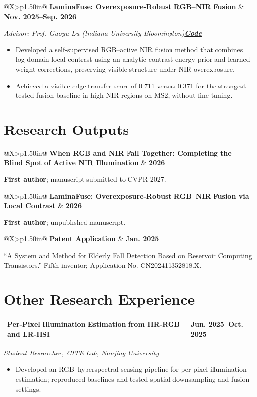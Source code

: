 \documentclass[11pt,letterpaper]{article}
\makeatletter
\newlength{\entryspacing}
\newcommand{\projectlink}[2]{\href{#1}{\textcolor{accent}{\textbf{#2}}}}
\newcommand{\projectlinks}[1]{\enspace\textup{\textbar\enspace #1}}
\newcommand{\datefont}[1]{{\fontsize{9.6}{13.5}\selectfont\bfseries\leavevmode\color{dateblue}#1}}
\newcommand{\entryheader}[2]{%
  \noindent\begin{tabularx}{\linewidth}{@{}X>{\raggedleft\arraybackslash}p{1.50in}@{}}
    {\fontsize{11}{14}\selectfont\bfseries #1} & \datefont{#2}
  \end{tabularx}\par
}
\newcommand{\researchentry}[3]{%
  \Needspace{5\baselineskip}%
  \entryheader{#1}{#2}%
  \vspace{2pt}%
  {\fontsize{10}{13}\selectfont\itshape #3\par}%
}
\newcommand{\compactentry}[3]{%
  \Needspace{4\baselineskip}%
  \entryheader{#1}{#2}%
  \vspace{2pt}%
  {\fontsize{11}{14.3}\selectfont #3\par}%
}
\newcommand{\tightbullets}{%
  \begin{itemize}[leftmargin=1.15em,labelsep=0.40em,itemsep=2pt,topsep=3pt,parsep=0pt,partopsep=0pt]
}
\newcommand{\tightbulletsend}{\end{itemize}}
\newcommand{\entrygap}{\par\vspace{\entryspacing}}
\makeatother
\begin{document}
\entrygap

\researchentry
  {LaminaFuse: Overexposure-Robust RGB--NIR Fusion}
  {Nov. 2025--Sep. 2026}
  {Advisor: Prof. Guoyu Lu (Indiana University Bloomington)\projectlinks{\projectlink{https://github.com/Darhan7/LaminaFuse}{Code}}}
\tightbullets
  \item Developed a self-supervised RGB--active NIR fusion method that combines log-domain local contrast using an analytic contrast-energy prior and learned weight corrections, preserving visible structure under NIR overexposure.
  \item Achieved a visible-edge transfer score of 0.711 versus 0.371 for the strongest tested fusion baseline in high-NIR regions on MS2, without fine-tuning.
\tightbulletsend



\section{Research Outputs}

\compactentry
  {When RGB and NIR Fail Together: Completing the Blind Spot of Active NIR Illumination}
  {2026}
  {\textbf{First author}; manuscript submitted to CVPR 2027.}

\entrygap

\compactentry
  {LaminaFuse: Overexposure-Robust RGB--NIR Fusion via Local Contrast}
  {2026}
  {\textbf{First author}; unpublished manuscript.}

\entrygap

\compactentry
  {Patent Application}
  {Jan. 2025}
  {``A System and Method for Elderly Fall Detection Based on Reservoir Computing Transistors.'' Fifth inventor; Application No. CN202411352818.X.}


\newpage
\section{Other Research Experience}

\researchentry
  {Per-Pixel Illumination Estimation from HR-RGB and LR-HSI}
  {Jun. 2025--Oct. 2025}
  {Student Researcher, CITE Lab, Nanjing University}
\tightbullets
  \item Developed an RGB--hyperspectral sensing pipeline for per-pixel illumination estimation; reproduced baselines and tested spatial downsampling and fusion settings.
\tightbulletsend
\end{document}
